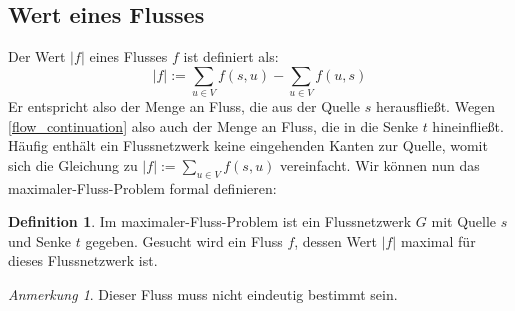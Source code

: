\documentclass[12pt,a4paper,titlepage,onecolumn,ngerman,bibliography=totocnumbered]{scrartcl}
\theoremstyle{definition}
\newtheorem*{definition}{Definition}
\theoremstyle{remark}
\newtheorem*{remark}{Anmerkung}
\begin{document}
\subsection{Wert eines Flusses}
Der Wert $\lvert f \rvert$ eines Flusses $f$ ist definiert als:
\begin{equation}\label{flow_value}
\lvert f \rvert := \sum_{u\in V} f(s,u) - \sum_{u\in V} f(u,s)
\end{equation}
Er entspricht also der Menge an Fluss, die aus der Quelle $s$ herausfließt.
Wegen \eqref{flow_continuation} also auch der Menge an Fluss, die in die Senke $t$ hineinfließt.
Häufig enthält ein Flussnetzwerk keine eingehenden Kanten zur Quelle, womit sich die Gleichung zu $\lvert f \rvert := \sum_{u\in V} f(s,u)$ vereinfacht.
Wir können nun das maximaler-Fluss-Problem formal definieren:

\begin{definition}
Im maximaler-Fluss-Problem ist ein Flussnetzwerk $G$ mit Quelle $s$ und Senke $t$ gegeben.
Gesucht wird ein Fluss $f$, dessen Wert $\lvert f\rvert$ maximal für dieses Flussnetzwerk ist.
\end{definition}
\begin{remark}    
Dieser Fluss muss nicht eindeutig bestimmt sein. %
\end{remark}
\end{document}
